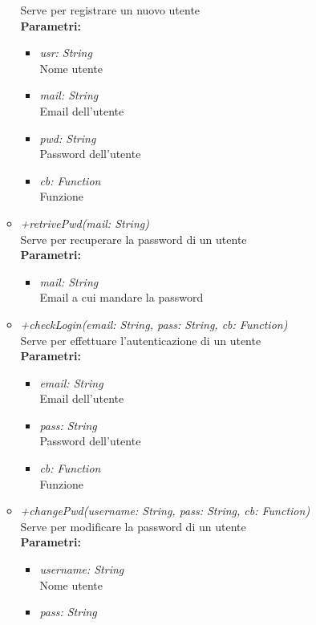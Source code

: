 \begin{itemize}
\begin{itemize}
    		Serve per registrare un nuovo utente\\
    		\textbf{Parametri:}
    		\begin{itemize}
    			\item \emph{usr: String}\\
    			Nome utente
    			\item \emph{mail: String}\\
    			Email dell'utente
    			\item \emph{pwd: String}\\
    			Password dell'utente
    			\item \emph{cb: Function}\\
    			Funzione
    		\end{itemize}
    		\item \emph{+retrivePwd(mail: String)}\\
    		Serve per recuperare la password di un utente\\
    		\textbf{Parametri:}
    		\begin{itemize}
    			\item \emph{mail: String}\\
    			Email a cui mandare la password
    		\end{itemize}
    		\item \emph{+checkLogin(email: String, pass: String, cb: Function)}\\
    		Serve per effettuare l'autenticazione di un utente\\
    		\textbf{Parametri:}
    		\begin{itemize}
    			\item \emph{email: String}\\
    			Email dell'utente
    			\item \emph{pass: String}\\
    			Password dell'utente
    			\item \emph{cb: Function}\\
    			Funzione
    		\end{itemize}
    		\item \emph{+changePwd(username: String, pass: String, cb: Function)}\\
    		Serve per modificare la password di un utente\\
    		\textbf{Parametri:}
    		\begin{itemize}
    			\item \emph{username: String}\\
    			Nome utente
    			\item \emph{pass: String}\\

\end{itemize}
\end{itemize}
\end{itemize}
